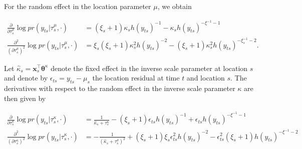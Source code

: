 \documentclass[11pt,english]{article}
\newcommand{\bs}[1]{\boldsymbol{#1}}
\newcommand{\pderiv}[2]{\frac{\partial #1}{\partial #2}}
\newcommand{\pderivsq}[1]{\frac{\partial^2}{(\partial #1)^2}}
\newcommand{\bl}{\begin{linenomath}}
\newcommand{\el}{\end{linenomath}}
\begin{document}
For the random effect in the location parameter $\mu$, we obtain 
\bl\begin{align*}
\pderiv{}{\tau_s^{\mu}} \log pr(y_{ts}|\tau_s^{\mu}, \cdot) & = (\xi_s + 1)\kappa_s h(y_{ts})^{-1} - \kappa_s h(y_{ts})^{-\xi^{-1}- 1} \\
\pderivsq{\tau_s^{\mu}} \log pr(y_{ts}|\tau_s^{\mu}, \cdot) &=\xi_s(\xi_s + 1)\kappa^2_sh(y_{ts})^{-2} - (\xi_s + 1)\kappa^2_sh(y_{ts})^{-\xi_s^{-1} - 2}.
\end{align*}\el
Let $\hat{\kappa}_s = \bs{x}_s^\top \bs{\theta}^\kappa$ denote the fixed effect in the inverse scale parameter at location $s$ and denote by $\epsilon_{ts} = y_{ts} - \mu_s$ the location residual at time $t$ and location $s$.  The derivatives with respect to the random effect in the inverse scale parameter $\kappa$ are then given by
\bl\begin{align*}
\pderiv{}{\tau_s^{\kappa}} \log pr(y_{ts}| \tau_s^\kappa, \cdot) &= \frac{1}{\hat{\kappa}_s + \tau_s^{\kappa}} - (\xi_s + 1)\epsilon_{ts}h(y_{ts})^{-1} + \epsilon_{ts}h(y_{ts})^{-\xi^{-1} - 1} \\
\pderivsq{\tau_s^{\kappa}} \log pr(y_{ts}|\tau_s^\kappa, \cdot) &=-\frac{1}{(\hat{\kappa}_s + \tau_s^{\sigma})^2} + (\xi_s + 1)\xi_s\epsilon_{ts}^2h(y_{ts})^{-2} - \epsilon_{ts}^2(\xi_s + 1)h(y_{ts})^{-\xi^{-1} - 2}
\end{align*}\el
\end{document}
